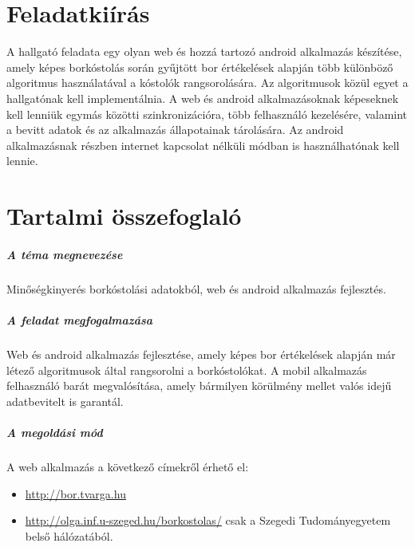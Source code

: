 \documentclass[12pt]{report}
\theoremstyle{definition}
\begin{document}
	\chapter*{Feladatkiírás}
	A hallgató feladata egy olyan web és hozzá tartozó android alkalmazás készítése, amely képes borkóstolás során gyűjtött bor értékelések alapján több különböző algoritmus használatával a kóstolók rangsorolására. Az algoritmusok közül egyet a hallgatónak kell implementálnia. A web és android alkalmazásoknak képeseknek kell lenniük egymás közötti szinkronizációra, több felhasználó kezelésére, valamint a bevitt adatok és az alkalmazás állapotainak tárolására. Az android alkalmazásnak részben internet kapcsolat nélküli módban is használhatónak kell lennie.
	
	\chapter*{Tartalmi összefoglaló}
	
	\paragraph{A téma megnevezése}
	Minőségkinyerés borkóstolási adatokból, web és android alkalmazás fejlesztés.
	
	\paragraph{A feladat megfogalmazása}
	Web és android alkalmazás fejlesztése, amely képes bor értékelések alapján már létező algoritmusok által rangsorolni a borkóstolókat. A mobil alkalmazás felhasználó barát megvalósítása, amely bármilyen körülmény mellet valós idejű adatbevitelt is garantál.
	
	\paragraph{A megoldási mód}
	A web alkalmazás a következő címekről érhető el:
	\begin{itemize}
		\item \url{http://bor.tvarga.hu}
		\item \url{http://olga.inf.u-szeged.hu/borkostolas/} csak a Szegedi Tudományegyetem belső hálózatából.
	\end{itemize}
	
\end{document}
